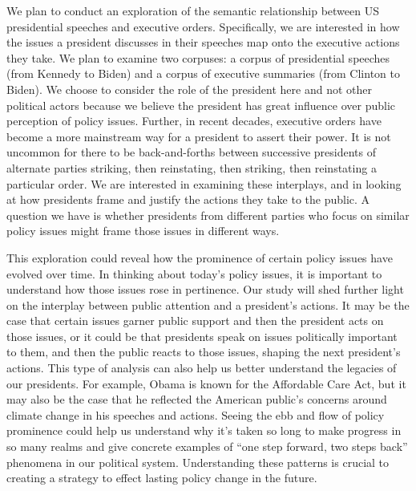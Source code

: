 \documentclass{article}
\begin{document}
{We plan to conduct an exploration of the semantic relationship between US presidential speeches and executive orders. Specifically, we are interested in how the issues a president discusses in their speeches map onto the executive actions they take. We plan to examine two corpuses: a corpus of presidential speeches (from Kennedy to Biden) and a corpus of executive summaries (from Clinton to Biden). We choose to consider the role of the president here and not other political actors because we believe the president has great influence over public perception of policy issues. Further, in recent decades, executive orders have become a more mainstream way for a president to assert their power. It is not uncommon for there to be back-and-forths between successive presidents of alternate parties striking, then reinstating, then striking, then reinstating a particular order. We are interested in examining these interplays, and in looking at how presidents frame and justify the actions they take to the public. A question we have is whether presidents from different parties who focus on similar policy issues might frame those issues in different ways.

This exploration could reveal how the prominence of certain policy issues have evolved over time. In thinking about today’s policy issues, it is important to understand how those issues rose in pertinence. Our study will shed further light on the interplay between public attention and a president’s actions. It may be the case that certain issues garner public support and then the president acts on those issues, or it could be that presidents speak on issues politically important to them, and then the public reacts to those issues, shaping the next president’s actions. This type of analysis can also help us better understand the legacies of our presidents. For example, Obama is known for the Affordable Care Act, but it may also be the case that he reflected the American public’s concerns around climate change in his speeches and actions. Seeing the ebb and flow of policy prominence could help us understand why it’s taken so long to make progress in so many realms and give concrete examples of “one step forward, two steps back” phenomena in our political system. Understanding these patterns is crucial to creating a strategy to effect lasting policy change in the future.

}
\newpage
\end{document}
